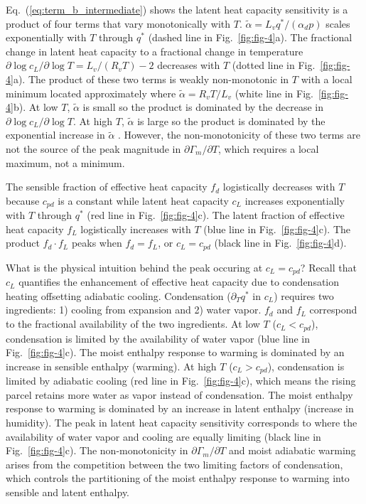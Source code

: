 \documentclass[draft,twocol]{ametsocV6.1}
\begin{document}
Eq.~(\ref{eq:term_b_intermediate}) shows the latent heat capacity sensitivity is a product of four terms that vary monotonically with $T$. $\tilde{\alpha}=L_v q^* / (\alpha_d p)$ scales exponentially with $T$ through $q^*$ (dashed line in Fig.~\ref{fig:fig-4}a). The fractional change in latent heat capacity to a fractional change in temperature $\partial\log{c_L}/\partial\log{T} = L_v / (R_v T) - 2$ decreases with $T$ (dotted line in Fig.~\ref{fig:fig-4}a). The product of these two terms is weakly non-monotonic in $T$ with a local minimum located approximately where $\tilde{\alpha} = R_vT/L_v$ (white line in Fig.~\ref{fig:fig-4}b). At low $T$, $\tilde{\alpha}$ is small so the product is dominated by the decrease in $\partial\log{c_L}/\partial\log{T}$. At high $T$, $\tilde{\alpha}$ is large so the product is dominated by the exponential increase in $\tilde{\alpha}$ . However, the non-monotonicity of these two terms are not the source of the peak magnitude in $\partial\Gamma_m/\partial T$, which requires a local maximum, not a minimum.

The sensible fraction of effective heat capacity $f_d$ logistically decreases with $T$ because $c_{pd}$ is a constant while latent heat capacity $c_L$ increases exponentially with $T$ through $q^*$ (red line in Fig.~\ref{fig:fig-4}c). The latent fraction of effective heat capacity $f_L$ logistically increases with $T$ (blue line in Fig.~\ref{fig:fig-4}c). The product $f_d\cdot f_L$ peaks when $f_d=f_L$, or $c_L = c_{pd}$ (black line in Fig.~\ref{fig:fig-4}d).

What is the physical intuition behind the peak occuring at $c_L = c_{pd}$? Recall that $c_L$ quantifies the enhancement of effective heat capacity due to condensation heating offsetting adiabatic cooling. Condensation ($\partial_T q^*$ in $c_L$) requires two ingredients: 1) cooling from expansion and 2) water vapor. $f_d$ and $f_L$ correspond to the fractional availability of the two ingredients. At low $T$ ($c_L < c_{pd}$), condensation is limited by the availability of water vapor (blue line in Fig.~\ref{fig:fig-4}c). The moist enthalpy response to warming is dominated by an increase in sensible enthalpy (warming). At high $T$ ($c_L > c_{pd}$), condensation is limited by adiabatic cooling (red line in Fig.~\ref{fig:fig-4}c), which means the rising parcel retains more water as vapor instead of condensation. The moist enthalpy response to warming is dominated by an increase in latent enthalpy (increase in humidity). The peak in latent heat capacity sensitivity corresponds to where the availability of water vapor and cooling are equally limiting (black line in Fig.~\ref{fig:fig-4}c). The non-monotonicity in $\partial\Gamma_m/\partial T$ and moist adiabatic warming arises from the competition between the two limiting factors of condensation, which controls the partitioning of the moist enthalpy response to warming into sensible and latent enthalpy.
\end{document}
